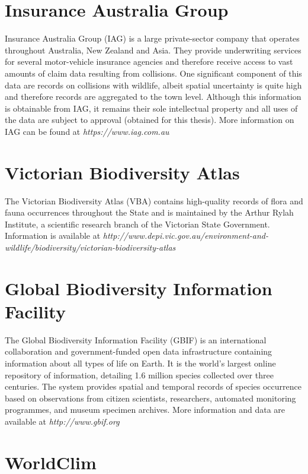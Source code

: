 \section{Insurance Australia Group}

Insurance Australia Group (IAG) is a large private-sector company that operates throughout Australia, New Zealand and Asia. They provide underwriting services for several motor-vehicle insurance agencies and therefore receive access to vast amounts of claim data resulting from collisions. One significant component of this data are records on collisions with wildlife, albeit spatial uncertainty is quite high and therefore records are aggregated to the town level. Although this information is obtainable from IAG, it remains their sole intellectual property and all uses of the data are subject to approval (obtained for this thesis). More information on IAG can be found at \textit{https://www.iag.com.au}

\section{Victorian Biodiversity Atlas}

The Victorian Biodiversity Atlas (VBA) contains high-quality records of flora and fauna occurrences throughout the State and is maintained by the Arthur Rylah Institute, a scientific research branch of the Victorian State Government. Information is available at \textit{http://www.depi.vic.gov.au/environment-and-wildlife/biodiversity/victorian-biodiversity-atlas}

\section{Global Biodiversity Information Facility}

The Global Biodiversity Information Facility (GBIF) is an international collaboration and government-funded open data infrastructure containing information about all types of life on Earth. It is the world's largest online repository of information, detailing 1.6 million species collected over three centuries. The system provides spatial and temporal records of species occurrence based on observations from citizen scientists, researchers, automated monitoring programmes, and museum specimen archives. More information and data are available at \textit{http://www.gbif.org}

\section{WorldClim}

